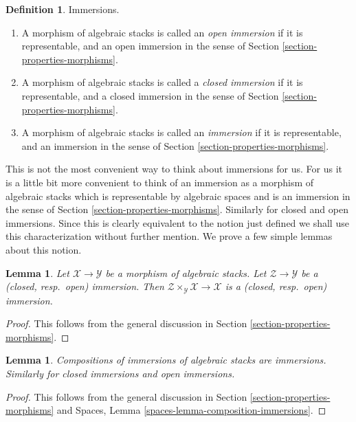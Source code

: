 \documentclass{stacks-project}
\theoremstyle{plain}
\newtheorem{lemma}[subsection]{Lemma}
\theoremstyle{definition}
\newtheorem{definition}[subsection]{Definition}
\theoremstyle{remark}
\numberwithin{equation}{subsection}
\begin{document}
\begin{definition}
\label{definition-immersion}
Immersions.
\begin{enumerate}
\item A morphism of algebraic stacks is called an {\it open immersion}
if it is representable, and an open immersion
in the sense of
Section \ref{section-properties-morphisms}.
\item A morphism of algebraic stacks is called a {\it closed immersion}
if it is representable, and a closed immersion
in the sense of
Section \ref{section-properties-morphisms}.
\item A morphism of algebraic stacks is called an {\it immersion}
if it is representable, and an immersion
in the sense of
Section \ref{section-properties-morphisms}.
\end{enumerate}
\end{definition}

\noindent
This is not the most convenient way to think about immersions for us.
For us it is a little bit more convenient to think of an immersion
as a morphism of algebraic stacks which is representable by algebraic
spaces and is an immersion in the sense of
Section \ref{section-properties-morphisms}.
Similarly for closed and open immersions.
Since this is clearly equivalent to the notion just defined we shall
use this characterization without further mention.
We prove a few simple lemmas about this notion.

\begin{lemma}
\label{lemma-base-change-immersion}
Let $\mathcal{X} \to \mathcal{Y}$ be a morphism of algebraic stacks.
Let $\mathcal{Z} \to \mathcal{Y}$ be a
(closed, resp.\ open) immersion.
Then $\mathcal{Z} \times_\mathcal{Y} \mathcal{X} \to \mathcal{X}$
is a (closed, resp.\ open) immersion.
\end{lemma}

\begin{proof}
This follows from the general discussion in
Section \ref{section-properties-morphisms}.
\end{proof}

\begin{lemma}
\label{lemma-composition-immersion}
Compositions of immersions of algebraic stacks are immersions.
Similarly for closed immersions and open immersions.
\end{lemma}

\begin{proof}
This follows from the general discussion in
Section \ref{section-properties-morphisms}
and
Spaces, Lemma \ref{spaces-lemma-composition-immersions}.
\end{proof}
\end{document}
